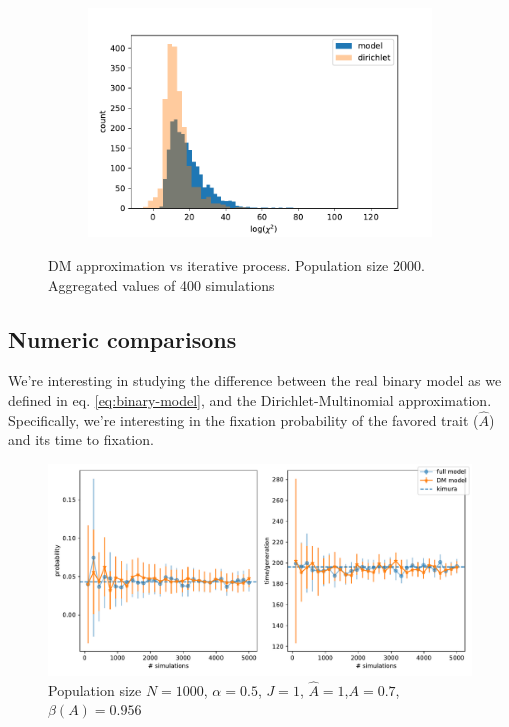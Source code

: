 \documentclass[11pt]{article}
\begin{document}
\begin{figure}[t]
\begin{center}
\begin{subfigure}[a]{0.3\textwidth}
    \end{subfigure}
    \begin{subfigure}[a]{0.3\textwidth}
    \includegraphics[width=\linewidth]{../figures/chi_square_stats/chi_hist_homogenous_J.pdf}
  \end{subfigure}
  \caption{DM approximation vs iterative process. Population size 2000. 			Aggregated values of 400 simulations}	
  \label{fig:chiSquaredHist}
  \end{center}
\end{figure}


\subsection{Numeric comparisons}
We're interesting in studying the difference between the real binary model as we defined in eq. \ref{eq:binary-model}, and the Dirichlet-Multinomial approximation. Specifically, we're interesting in the fixation probability of the favored trait ($\hat{A}$) and its time to fixation.

\begin{figure}
    \includegraphics[width=\linewidth]{../figures/binary/num_sims.pdf}
  \caption{Population size $N=1000$, $\alpha=0.5$, $J=1$, $\hat{A}=1$,$A=0.7$, $\beta(A)=0.956$}	
  \label{fig:num_sims}
\end{figure}
\end{document}
